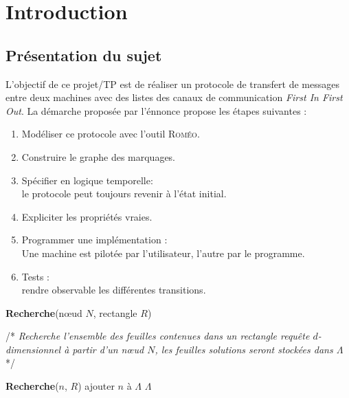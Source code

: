 \chapter{Introduction}\label{chap:Intro}
\section{Présentation du sujet}
L'objectif de ce projet/TP est de réaliser un protocole de transfert de messages entre deux machines avec des listes des canaux de communication \textit{First In First Out}. La démarche proposée par l'énnonce propose les  étapes  suivantes :
  
  
  \begin{enumerate}
  \item 
    Modéliser ce protocole avec l'outil \textsc{Roméo}.
  \item
    Construire le graphe des marquages.
  \item
    Spécifier en logique temporelle: \hfill \\
    le protocole peut toujours revenir à l’état initial.
  \item 
    Expliciter les propriétés vraies.
  \item
    Programmer une implémentation : \hfill \\
    Une machine est pilotée par l'utilisateur, l'autre par le programme.
  \item
    Tests  :\hfill \\
    rendre observable les différentes transitions.
  \end{enumerate}


\begin{algorithm}
\caption{\textbf{Recherche}(nœud $N$, rectangle $R$)}
/* \textit{Recherche l'ensemble des feuilles contenues dans un rectangle requête $d$-dimensionnel à partir d'un nœud $N$, les feuilles solutions seront stockées dans $\Lambda$} */
\label{algo:recherche}
\begin{algorithmic}[1]
    \STATE \textbf{Recherche}($n$, $R$)
  \ENDFOR
{}%
    \STATE ajouter $n$ à $\Lambda$
  \ENDFOR
\ENDIF
\RETURN $\Lambda$
\end{algorithmic}
\end{algorithm}

